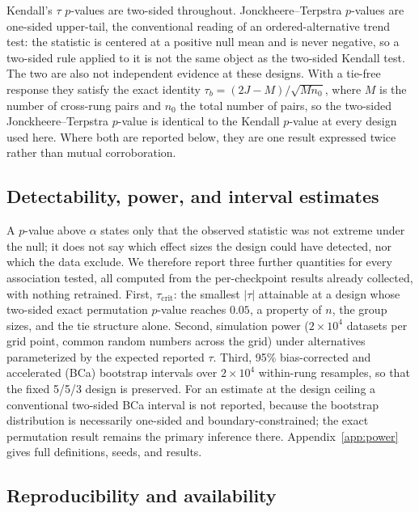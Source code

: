 Kendall's $\tau$ $p$-values are two-sided throughout. Jonckheere--Terpstra $p$-values are one-sided upper-tail, the conventional reading of an ordered-alternative trend test: the statistic is centered at a positive null mean and is never negative, so a two-sided rule applied to it is not the same object as the two-sided Kendall test. The two are also not independent evidence at these designs. With a tie-free response they satisfy the exact identity $\tau_b = (2J - M)/\sqrt{M n_0}$, where $M$ is the number of cross-rung pairs and $n_0$ the total number of pairs, so the two-sided Jonckheere--Terpstra $p$-value is identical to the Kendall $p$-value at every design used here. Where both are reported below, they are one result expressed twice rather than mutual corroboration.

\subsection{Detectability, power, and interval estimates}
\label{sec:power}

A $p$-value above $\alpha$ states only that the observed statistic was not extreme under the null; it does not say which effect sizes the design could have detected, nor which the data exclude. We therefore report three further quantities for every association tested, all computed from the per-checkpoint results already collected, with nothing retrained. First, $\tau_{\mathrm{crit}}$: the smallest $|\tau|$ attainable at a design whose two-sided exact permutation $p$-value reaches $0.05$, a property of $n$, the group sizes, and the tie structure alone. Second, simulation power ($2 \times 10^{4}$ datasets per grid point, common random numbers across the grid) under alternatives parameterized by the expected reported $\tau$. Third, 95\% bias-corrected and accelerated (BCa) bootstrap intervals \citep{efron1987better} over $2 \times 10^{4}$ within-rung resamples, so that the fixed 5/5/3 design is preserved. For an estimate at the design ceiling a conventional two-sided BCa interval is not reported, because the bootstrap distribution is necessarily one-sided and boundary-constrained; the exact permutation result remains the primary inference there. Appendix~\ref{app:power} gives full definitions, seeds, and results.

\subsection{Reproducibility and availability}
\label{sec:reproducibility}

